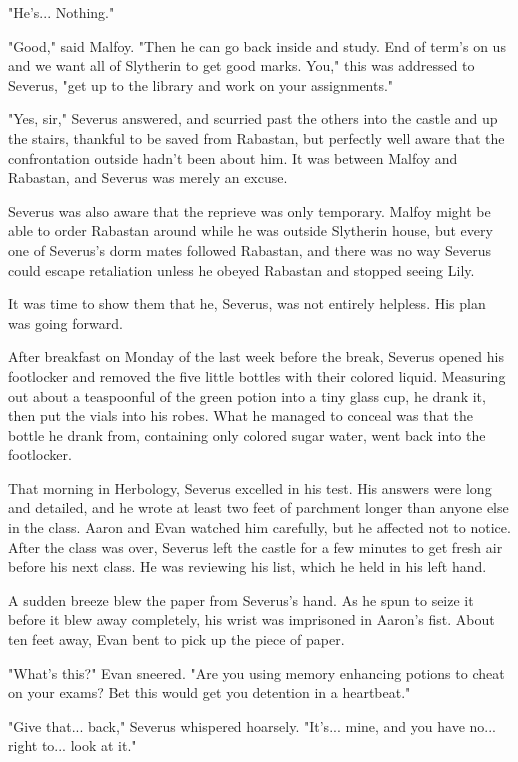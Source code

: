 \documentclass[a4paper,11pt]{article}
\begin{document}
"He's... Nothing."

"Good," said Malfoy. "Then he can go back inside and study. End of term's on us and we want all of Slytherin to get good marks. You," this was addressed to Severus, "get up to the library and work on your assignments."

"Yes, sir," Severus answered, and scurried past the others into the castle and up the stairs, thankful to be saved from Rabastan, but perfectly well aware that the confrontation outside hadn't been about him. It was between Malfoy and Rabastan, and Severus was merely an excuse.

Severus was also aware that the reprieve was only temporary. Malfoy might be able to order Rabastan around while he was outside Slytherin house, but every one of Severus's dorm mates followed Rabastan, and there was no way Severus could escape retaliation unless he obeyed Rabastan and stopped seeing Lily.

It was time to show them that he, Severus, was not entirely helpless. His plan was going forward.

After breakfast on Monday of the last week before the break, Severus opened his footlocker and removed the five little bottles with their colored liquid. Measuring out about a teaspoonful of the green potion into a tiny glass cup, he drank it, then put the vials into his robes. What he managed to conceal was that the bottle he drank from, containing only colored sugar water, went back into the footlocker.

That morning in Herbology, Severus excelled in his test. His answers were long and detailed, and he wrote at least two feet of parchment longer than anyone else in the class. Aaron and Evan watched him carefully, but he affected not to notice. After the class was over, Severus left the castle for a few minutes to get fresh air before his next class. He was reviewing his list, which he held in his left hand.

A sudden breeze blew the paper from Severus's hand. As he spun to seize it before it blew away completely, his wrist was imprisoned in Aaron's fist. About ten feet away, Evan bent to pick up the piece of paper.

"What's this?" Evan sneered. "Are you using memory enhancing potions to cheat on your exams? Bet this would get you detention in a heartbeat."

"Give that... back," Severus whispered hoarsely. "It's... mine, and you have no... right to... look at it."
\end{document}
